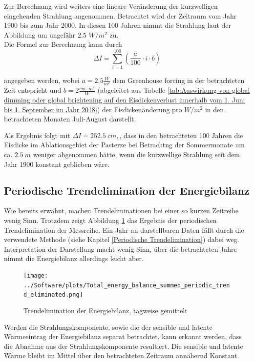 \documentclass[12pt,a4paper]{article}
\begin{document}
Zur Berechnung wird weiters eine lineare Veränderung der kurzwelligen eingehenden Strahlung angenommen. Betrachtet wird der Zeitraum vom Jahr 1900 bis zum Jahr 2000. In diesen 100 Jahren nimmt die Strahlung laut der Abbildung um ungefähr $2.5$ $W/m^2$ zu.\\

Die Formel zur Berechnung kann durch
\begin{equation}
\Delta I =\sum_{i=1}^{100}\left ( \frac{a}{100}\cdot i \cdot b \right )
\end{equation}

angegeben werden, wobei $a=2.5\frac{W}{m^2}$ dem Greenhouse forcing in der betrachteten Zeit entspricht und $b=2 \frac{cm \cdot m^2}{W}$ (abgeleitet aus Tabelle \ref{tab:Auswirkung von global dimming oder global brightening auf den Eisdickenverlust innerhalb vom 1. Juni bis 1. September im Jahr 2018}) der Eisdickenänderung pro $W/m^2$ in den betrachteten Monaten Juli-August darstellt. 

Als Ergebnis folgt mit $\Delta I = 252.5~cm,$, dass in den betrachteten 100 Jahren die Eisdicke im Ablationsgebiet der Pasterze bei Betrachtng der Sommermonate um ca. $2.5~m$ weniger abgenommen hätte, wenn die kurzwellige Strahlung seit dem Jahr 1900 konstant geblieben wäre.



\subsection{Periodische Trendelimination der Energiebilanz}

Wie bereits erwähnt, machen Trendeliminationen bei einer so kurzen Zeitreihe wenig Sinn. Trotzdem zeigt Abbildung \ref{fig:Trendelimination der Energiebilanz} das Ergebnis der periodischen Trendelimination der Messreihe. Ein Jahr an darstellbaren Daten fällt durch die verwendete Methode (siehe Kapitel \ref{Periodische Trendelimination}) dabei weg. Interpretation der Darstellung macht wenig Sinn, über die betrachteten Jahre nimmt die Energiebilanz allerdings leicht aber. 

\begin{figure}[H]
\centering
\texttt{[image: ../Software/plots/Total\_energy\_balance\_summed\_periodic\_trend\_eliminated.png]}
\caption{Trendelimination der Energiebilanz, tagweise gemittelt}
\label{fig:Trendelimination der Energiebilanz}
\end{figure}

Werden die Strahlungskomponente, sowie die der sensible und latente Wärmeeintrag der Energiebilanz separat betrachtet, kann erkannt werden, dass  die Abnahme aus der Strahlungskomponente resultiert. Die sensible und latente Wärme bleibt im Mittel über den betrachteten Zeitraum annähernd Konstant.
\end{document}
